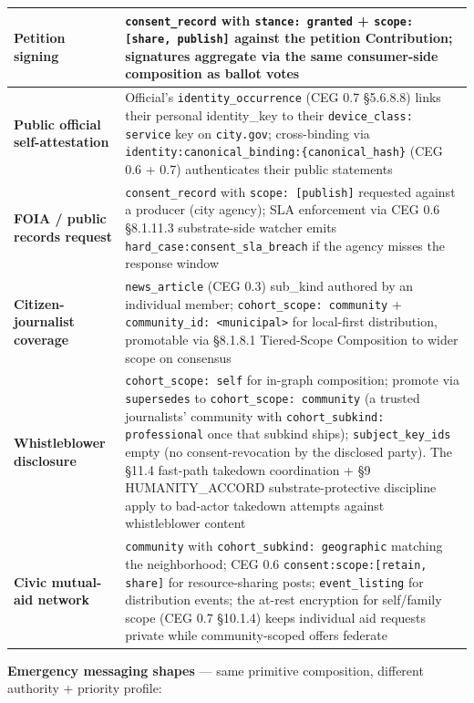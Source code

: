 \documentclass[10pt]{article}
\begin{document}
{\begin{longtable}{|p{8.0cm}|p{8.0cm}|}
\textbf{Petition signing} & \texttt{consent\_record} with \texttt{stance: granted} + \texttt{scope: [share, publish]} against the petition Contribution; signatures aggregate via the same consumer-side composition as ballot votes \\ \hline
\textbf{Public official self-attestation} & Official's \texttt{identity\_occurrence} (CEG 0.7 §5.6.8.8) links their personal identity\_key to their \texttt{device\_class: service} key on \texttt{city.gov}; cross-binding via \texttt{identity:canonical\_binding:\{canonical\_hash\}} (CEG 0.6 + 0.7) authenticates their public statements \\ \hline
\textbf{FOIA / public records request} & \texttt{consent\_record} with \texttt{scope: [publish]} requested against a producer (city agency); SLA enforcement via CEG 0.6 §8.1.11.3 substrate-side watcher emits \texttt{hard\_case:consent\_sla\_breach} if the agency misses the response window \\ \hline
\textbf{Citizen-journalist coverage} & \texttt{news\_article} (CEG 0.3) sub\_kind authored by an individual member; \texttt{cohort\_scope: community} + \texttt{community\_id: <municipal>} for local-first distribution, promotable via §8.1.8.1 Tiered-Scope Composition to wider scope on consensus \\ \hline
\textbf{Whistleblower disclosure} & \texttt{cohort\_scope: self} for in-graph composition; promote via \texttt{supersedes} to \texttt{cohort\_scope: community} (a trusted journalists' community with \texttt{cohort\_subkind: professional} once that subkind ships); \texttt{subject\_key\_ids} empty (no consent-revocation by the disclosed party). The §11.4 fast-path takedown coordination + §9 HUMANITY\_ACCORD substrate-protective discipline apply to bad-actor takedown attempts against whistleblower content \\ \hline
\textbf{Civic mutual-aid network} & \texttt{community} with \texttt{cohort\_subkind: geographic} matching the neighborhood; CEG 0.6 \texttt{consent:scope:[retain, share]} for resource-sharing posts; \texttt{event\_listing} for distribution events; the at-rest encryption for self/family scope (CEG 0.7 §10.1.4) keeps individual aid requests private while community-scoped offers federate \\ \hline
\end{longtable}}


\textbf{Emergency messaging shapes} — same primitive composition, different authority + priority profile:
\end{document}
